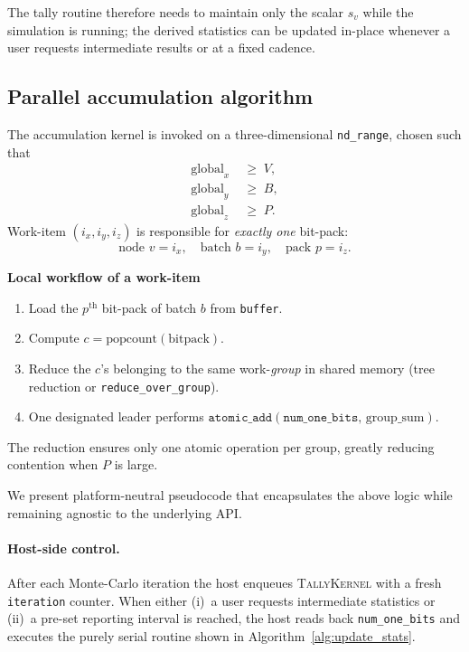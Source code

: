 The tally routine therefore needs to maintain only the scalar
\(s_v\) while the simulation is running; the derived statistics can be updated
in-place whenever a user requests intermediate results or at a fixed cadence.

\subsection{Parallel accumulation algorithm}

The accumulation kernel is invoked on a three-dimensional
\texttt{nd\_range}, chosen such that
\[
  \begin{aligned}
    \text{global}_x &\;\ge\; V,\\
    \text{global}_y &\;\ge\; B,\\
    \text{global}_z &\;\ge\; P.
  \end{aligned}
\]
Work-item \((i_x,i_y,i_z)\) is responsible for \emph{exactly one} bit-pack:
\[
  \text{node  } v=i_x,\quad
  \text{batch } b=i_y,\quad
  \text{pack  } p=i_z.
\]

\vspace{4pt}
\noindent
\textbf{Local workflow of a work-item}
\begin{enumerate}
    \item Load the \(p^{\text{th}}\) bit-pack of batch \(b\) from
          \texttt{buffer}.
    \item Compute \(c=\mathrm{popcount}(\text{bitpack})\).
    \item Reduce the \(c\)'s belonging to the same work-\emph{group} in
          shared memory (tree reduction or \texttt{reduce\_over\_group}).
    \item One designated leader performs
          \(\texttt{atomic\_add}(\texttt{num\_one\_bits},\,\text{group\_sum})\).
\end{enumerate}

The reduction ensures only one atomic operation per group, greatly reducing
contention when \(P\) is large.

We present platform-neutral pseudocode that encapsulates the above logic while remaining agnostic to the underlying API.

\paragraph{Host-side control.}
After each Monte-Carlo iteration the host enqueues \textsc{TallyKernel} with a
fresh \texttt{iteration} counter.  When either (i)~a user requests
intermediate statistics or (ii)~a pre-set reporting interval is reached,
the host reads back \texttt{num\_one\_bits} and executes the purely
serial routine shown in Algorithm~\ref{alg:update_stats}.

